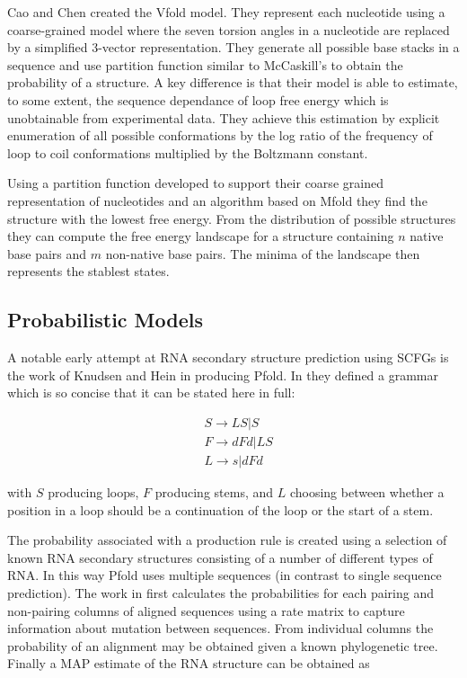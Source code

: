 \documentclass[journal]{IEEEtran}
\begin{document}
Cao and Chen \cite{cao2005predicting} created the Vfold model. They represent each nucleotide using a coarse-grained model where the seven torsion angles in a nucleotide are replaced by a simplified 3-vector representation. They generate all possible base stacks in a sequence and use partition function similar to McCaskill's to obtain the probability of a structure. A key difference is that their model is able to estimate, to some extent, the sequence dependance of loop free energy which is unobtainable from experimental data. They achieve this estimation by explicit enumeration of all possible conformations by the log ratio of the frequency of loop to coil conformations multiplied by the Boltzmann constant.

Using a partition function developed to support their coarse grained representation of nucleotides and an algorithm based on Mfold \cite{mathews1999expanded} they find the structure with the lowest free energy. From the distribution of possible structures they can compute the free energy landscape for a structure containing $n$ native base pairs and $m$ non-native base pairs. The minima of the landscape then represents the stablest states.

\subsection{Probabilistic Models}
\label{subsec:probalistic-models}


A notable early attempt at RNA secondary structure prediction using SCFGs is the work of Knudsen and Hein \cite{knudsen1999rna, knudsen2003pfold} in producing Pfold. In \cite{knudsen1999rna} they defined a grammar which is so concise that it can be stated here in full:

\begin{equation}
\begin{split}
	& S \rightarrow LS | S \\
	& F \rightarrow dFd | LS \\
	& L \rightarrow s | dFd 
\end{split}
\end{equation}

with $S$ producing loops, $F$ producing stems, and $L$ choosing between whether a position in a loop should be a continuation of the loop or the start of a stem.

The probability associated with a production rule is created using a selection of known RNA secondary structures consisting of a number of different types of RNA. In this way Pfold uses multiple sequences (in contrast to single sequence prediction). The work in \cite{knudsen1999rna} first calculates the probabilities for each pairing and non-pairing columns of aligned sequences using a rate matrix to capture information about mutation between sequences. From individual columns the probability of an alignment may be obtained given a known phylogenetic tree. Finally a MAP estimate of the RNA structure can be obtained as
\end{document}
